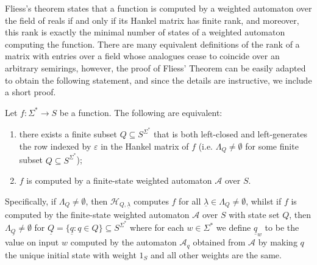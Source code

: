 \documentclass{lmcs}
\numberwithin{theorem}{section}
\begin{document}
Fliess's theorem \cite{F74} states that a function is computed by a weighted automaton over the field of reals if and only if its Hankel matrix has finite rank, and moreover, this rank is exactly the minimal number of states of a weighted automaton computing the function. There are many equivalent definitions of the rank of a matrix with entries over a field whose analogues cease to coincide over an arbitrary semirings, however, the proof of Fliess' Theorem can be easily adapted to obtain the following statement, and since the details are instructive, we include a short proof.
\begin{thm}
\label{theorem:prelim}
Let $f: \Sigma^* \rightarrow S$ be a function. The following are equivalent:
\begin{enumerate}
\item there exists a finite subset $Q \subseteq S^{\Sigma^*}$ that is both left-closed and left-generates the row indexed by $\varepsilon$ in the Hankel matrix of $f$ (i.e. $\Lambda_Q \neq \emptyset$ for some finite subset $Q\subseteq S^{\Sigma^*}$);
\item $f$ is computed by a finite-state weighted automaton $\mathcal{A}$ over $S$.   
\end{enumerate}
Specifically, if $\Lambda_Q \neq \emptyset$, then $\mathcal{H}_{Q, \underline{\lambda}}$ computes $f$ for all $\underline{\lambda} \in \Lambda_Q \neq \emptyset$, whilst if $f$ is computed by the finite-state weighted automaton $\mathcal{A}$ over $S$ with state set $Q$, then $\Lambda_{\underline{Q}} \neq \emptyset$ for $\underline{Q} = \{\underline{q}: q \in Q\} \subseteq S^{\Sigma^*}$ where for each $w \in \Sigma^*$ we define  $\underline{q}_w$ to be the value on input $w$ computed by the automaton $\mathcal{A}_q$ obtained from $\mathcal{A}$ by making $q$ the unique initial state with weight $1_S$ and all other weights are the same.
\end{thm}
\end{document}
